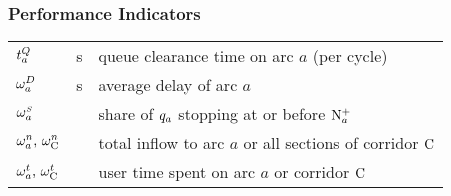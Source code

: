 \subsubsection*{Performance Indicators}
\begin{tabu} to \textwidth {X[3,c] X[1,c] X[6,l]}
$ t_{a}^Q $ & s & queue clearance time on arc $a$ (per cycle)\\[2pt]
$ \omega_{a}^{D} $ & s & average delay of arc $a$ \\[2pt]
$ \omega_{a}^{\scriptscriptstyle{S}}$ & & share of $q_a$ stopping at or before $\mathrm{N}_{a}^{+}$ \\[2pt]
$ \omega_{a}^{n} \text{, } \omega_{\mathrm{C}}^{n} $ &  & total inflow to arc $a$ or all sections of corridor $\mathrm{C}$ \\[2pt]
$ \omega_{a}^{t} \text{, } \omega_{\mathrm{C}}^{t} $ &  & user time spent on arc $a$ or corridor $\mathrm{C}$ \\[2pt]
\end{tabu}